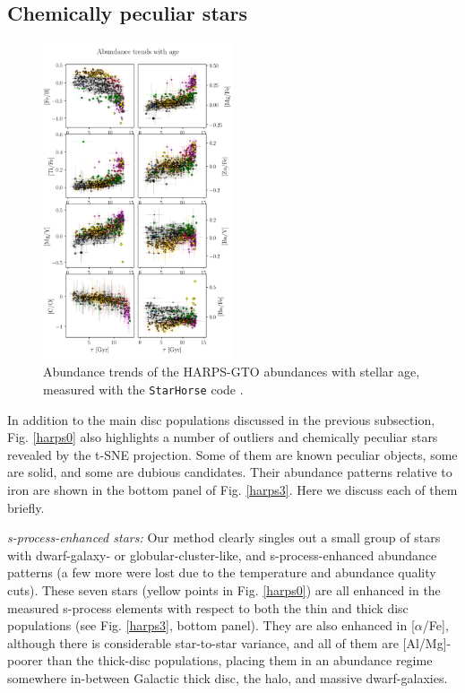 \documentclass{aa}  %
\begin{document}
\subsection{Chemically peculiar stars}\label{peculiar}

\begin{figure}\centering
 \includegraphics[width=0.5\textwidth]{im/harps_tsne-age-abundsplot_teffcut.png}
\caption{Abundance trends of the HARPS-GTO abundances with stellar age, measured with the \texttt{StarHorse} code \citep{Queiroz2018}.}
\label{age}
\end{figure}

In addition to the main disc populations discussed in the previous subsection, Fig. \ref{harps0} also highlights a number of outliers and chemically peculiar stars revealed by the t-SNE projection. Some of them are known peculiar objects, some are solid, and some are dubious candidates. Their abundance patterns relative to iron are shown in the bottom panel of Fig. \ref{harps3}. Here we discuss each of them briefly.

{\it s-process-enhanced stars:} Our method clearly singles out a small group of stars with dwarf-galaxy- or globular-cluster-like, and s-process-enhanced abundance patterns (a few more were lost due to the temperature and abundance quality cuts). These seven stars (yellow points in Fig. \ref{harps0}) are all enhanced in the measured s-process elements with respect to both the thin and thick disc populations (see Fig. \ref{harps3}, bottom panel). They are also enhanced in [$\alpha$/Fe], although there is considerable star-to-star variance, and all of them are [Al/Mg]-poorer than the thick-disc populations, placing them in an abundance regime somewhere in-between Galactic thick disc, the halo, and massive dwarf-galaxies. 
\end{document}
